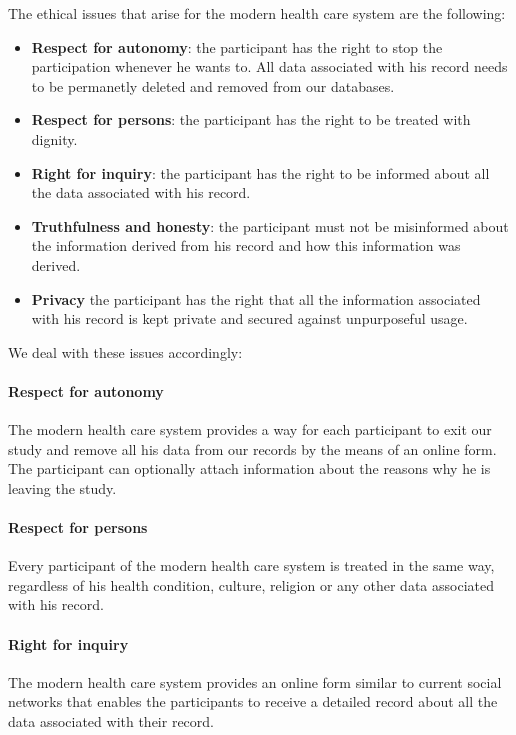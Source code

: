 \documentclass[a4paper,11pt]{article}
\begin{document}
The ethical issues that arise for the modern health care system are the following:

\begin{itemize}
	\item \textbf{Respect for autonomy}: the participant has the right to stop the participation whenever he wants to. All data associated with his record needs to be permanetly deleted and removed from our databases.
	\item \textbf{Respect for persons}: the participant has the right to be treated with dignity.
	\item \textbf{Right for inquiry}: the participant has the right to be informed about all the data associated with his record.
	\item \textbf{Truthfulness and honesty}: the participant must not be misinformed about the information derived from his record and how this information was derived.
	\item \textbf{Privacy} the participant has the right that all the information associated with his record is kept private and secured against unpurposeful usage.
\end{itemize}

We deal with these issues accordingly:

\paragraph{Respect for autonomy}
The modern health care system provides a way for each participant to exit our study and remove all his data from our records by the means of an online form. The participant can optionally attach information about the reasons why he is leaving the study. 

\paragraph{Respect for persons}
Every participant of the modern health care system is treated in the same way, regardless of his health condition, culture, religion or any other data associated with his record.

\paragraph{Right for inquiry}
The modern health care system provides an online form similar to current social networks that enables the participants to receive a detailed record about all the data associated with their record.
\end{document}
